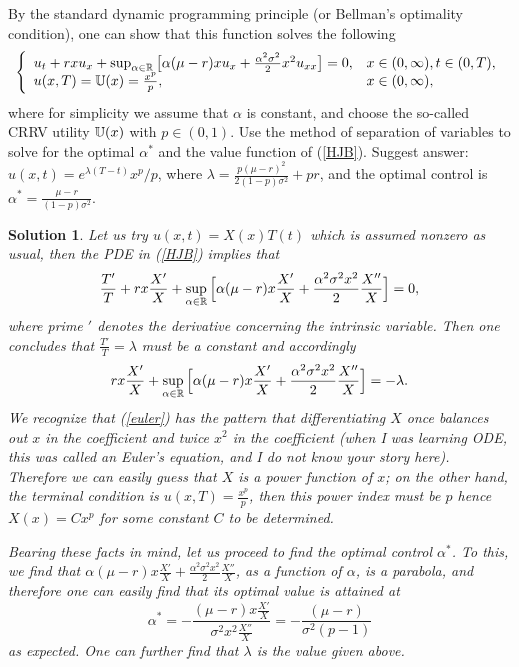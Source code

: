 \documentclass[6pt]{article}
\newtheorem{solution}{Solution}
\numberwithin{equation}{section}
\def\mathbb{\Bbb}
\begin{document}
\begin{enumerate}
By the standard dynamic programming principle (or Bellman's optimality condition), one can show that this function solves the following
\begin{equation}\label{HJB}
\left\{
\begin{array}{ll}
u_t+rxu_x+\sup_{\alpha\in\mathbb R}\big[\alpha(\mu-r)xu_x+\frac{\alpha^2\sigma^2}{2}x^2u_{xx}\big]=0,&x\in (0,\infty),t\in(0,T),\\
u(x,T)=\mathbb U(x)=\frac{x^p}{p},&x\in (0,\infty),
\end{array}
\right.
\end{equation}
where for simplicity we assume that $\alpha$ is constant, and choose the so-called CRRV utility $\mathbb U(x)$ with $p\in(0,1)$.  Use the method of separation of variables to solve for the optimal $\alpha^*$ and the value function of (\ref{HJB}).  Suggest answer: $u(x,t)=e^{\lambda(T-t)}x^p/p$, where $\lambda=\frac{p(\mu-r)^2}{2(1-p)\sigma^2}+pr$, and the optimal control is $\alpha^*=\frac{\mu-r}{(1-p)\sigma^2}$.
\begin{solution}
Let us try $u(x,t)=X(x)T(t)$ which is assumed nonzero as usual, then the PDE in (\ref{HJB}) implies that
\[\frac{T'}{T}+rx\frac{X'}{X}+\sup_{\alpha\in\mathbb R}\Big[\alpha(\mu-r)x\frac{X'}{X}+\frac{\alpha^2\sigma^2x^2}{2}\frac{X''}{X}\Big]=0,\]
where prime $'$ denotes the derivative concerning the intrinsic variable.  Then one concludes that $\frac{T'}{T}=\lambda$ must be a constant and accordingly
\begin{equation}\label{euler}
rx\frac{X'}{X}+\sup_{\alpha\in\mathbb R}\Big[\alpha(\mu-r)x\frac{X'}{X}+\frac{\alpha^2\sigma^2x^2}{2}\frac{X''}{X}\Big]=-\lambda.
\end{equation}
We recognize that (\ref{euler}) has the pattern that differentiating $X$ once balances out $x$ in the coefficient and twice $x^2$ in the coefficient (when I was learning ODE, this was called an Euler's equation, and I do not know your story here).  Therefore we can easily guess that $X$ is a power function of $x$; on the other hand, the terminal condition is $u(x,T)=\frac{x^p}{p}$, then this power index must be $p$ hence $X(x)=Cx^p$ for some constant $C$ to be determined.

Bearing these facts in mind, let us proceed to find the optimal control $\alpha^*$.  To this, we find that $\alpha(\mu-r)x\frac{X'}{X}+\frac{\alpha^2\sigma^2x^2}{2}\frac{X''}{X}$, as a function of $\alpha$, is a parabola, and therefore one can easily find that its optimal value is attained at
\[\alpha^*=-\frac{(\mu-r)x\frac{X'}{X}}{\sigma^2x^2\frac{X''}{X}}=-\frac{(\mu-r)}{\sigma^2(p-1)}\]
as expected.  One can further find that $\lambda$ is the value given above.


\end{solution}
\end{enumerate}
\end{document}
